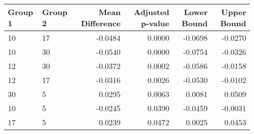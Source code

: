 \begin{tabular}{llrrrr}
\toprule
Group 1 & Group 2 & Mean Difference & Adjusted p-value & Lower Bound & Upper Bound \\
\midrule
10 & 17 & -0.0484 & 0.0000 & -0.0698 & -0.0270 \\
10 & 30 & -0.0540 & 0.0000 & -0.0754 & -0.0326 \\
12 & 30 & -0.0372 & 0.0002 & -0.0586 & -0.0158 \\
12 & 17 & -0.0316 & 0.0026 & -0.0530 & -0.0102 \\
30 & 5 & 0.0295 & 0.0063 & 0.0081 & 0.0509 \\
10 & 5 & -0.0245 & 0.0390 & -0.0459 & -0.0031 \\
17 & 5 & 0.0239 & 0.0472 & 0.0025 & 0.0453 \\
\bottomrule
\end{tabular}
